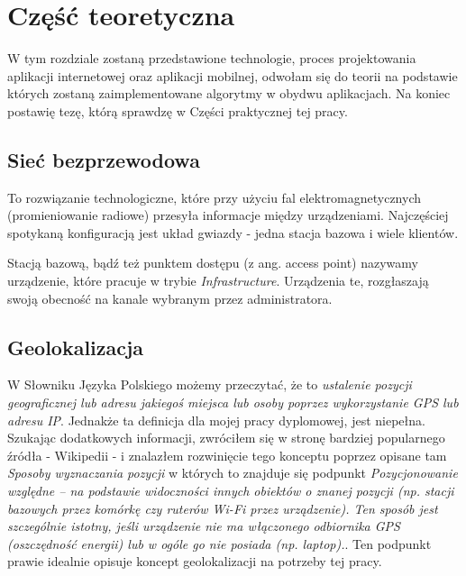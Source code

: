 \chapter{Część teoretyczna}

W tym rozdziale zostaną przedstawione technologie, proces projektowania aplikacji internetowej oraz aplikacji mobilnej, odwołam się do teorii na podstawie których zostaną zaimplementowane algorytmy w obydwu aplikacjach. Na koniec postawię tezę, którą sprawdzę w Części praktycznej tej pracy.

\section{Sieć bezprzewodowa}
To rozwiązanie technologiczne, które przy użyciu fal elektromagnetycznych (promieniowanie radiowe) przesyła informacje między urządzeniami. Najczęściej spotykaną konfiguracją jest układ gwiazdy - jedna stacja bazowa i wiele klientów. 

Stacją bazową, bądź też punktem dostępu (z ang. access point) nazywamy urządzenie, które pracuje w trybie \textit{Infrastructure}. Urządzenia te, rozgłaszają swoją obecność na kanale wybranym przez administratora. %


\section{Geolokalizacja}
W Słowniku Języka Polskiego możemy przeczytać, że to \textit{ustalenie pozycji geograficznej lub adresu jakiegoś miejsca lub osoby poprzez wykorzystanie GPS lub adresu IP}\cite{GeolokalizacjaSJP}. Jednakże ta definicja dla mojej pracy dyplomowej, jest niepełna. Szukając dodatkowych informacji, zwróciłem się w stronę bardziej popularnego źródła - Wikipedii - i znalazłem rozwinięcie tego konceptu poprzez opisane tam \textit{Sposoby wyznaczania pozycji} w których to znajduje się podpunkt \textit{Pozycjonowanie względne – na podstawie widoczności innych obiektów o znanej pozycji (np. stacji bazowych przez komórkę czy ruterów Wi-Fi przez urządzenie). Ten sposób jest szczególnie istotny, jeśli urządzenie nie ma włączonego odbiornika GPS (oszczędność energii) lub w ogóle go nie posiada (np. laptop).}\cite{GeolokalizacjaWiki}. Ten podpunkt prawie idealnie opisuje koncept geolokalizacji na potrzeby tej pracy. 

